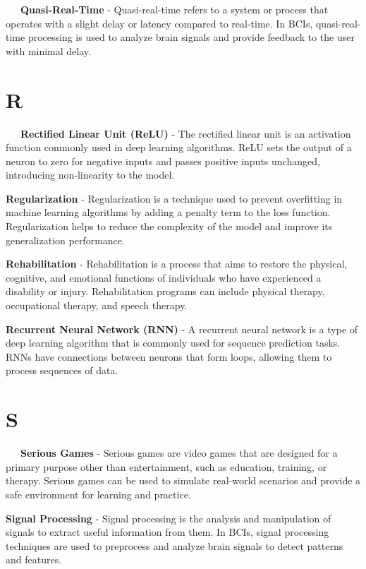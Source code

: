 \-\ \-\ \-\ \textbf{Quasi-Real-Time} - Quasi-real-time refers to a system or process that operates with a slight delay or latency compared to real-time. In BCIs, quasi-real-time processing is used to analyze brain signals and provide feedback to the user with minimal delay.

\section*{R}

\-\ \-\ \-\ \textbf{Rectified Linear Unit (ReLU)} - The rectified linear unit is an activation function commonly used in deep learning algorithms. ReLU sets the output of a neuron to zero for negative inputs and passes positive inputs unchanged, introducing non-linearity to the model.

\textbf{Regularization} - Regularization is a technique used to prevent overfitting in machine learning algorithms by adding a penalty term to the loss function. Regularization helps to reduce the complexity of the model and improve its generalization performance.

\textbf{Rehabilitation} - Rehabilitation is a process that aims to restore the physical, cognitive, and emotional functions of individuals who have experienced a disability or injury. Rehabilitation programs can include physical therapy, occupational therapy, and speech therapy.

\textbf{Recurrent Neural Network (RNN)} - A recurrent neural network is a type of deep learning algorithm that is commonly used for sequence prediction tasks. RNNs have connections between neurons that form loops, allowing them to process sequences of data.

\section*{S}

\-\ \-\ \-\ \textbf{Serious Games} - Serious games are video games that are designed for a primary purpose other than entertainment, such as education, training, or therapy. Serious games can be used to simulate real-world scenarios and provide a safe environment for learning and practice.

\textbf{Signal Processing} - Signal processing is the analysis and manipulation of signals to extract useful information from them. In BCIs, signal processing techniques are used to preprocess and analyze brain signals to detect patterns and features.

